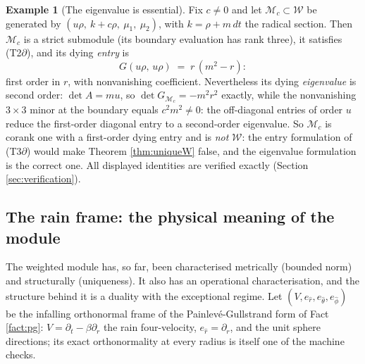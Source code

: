\documentclass[11pt]{article}
\theoremstyle{definition}
\newtheorem{example}[theorem]{Example}
\newcommand{\shW}{\mathcal{W}}
\newcommand{\dtPG}{dt}
\begin{document}
\begin{example}[The eigenvalue is essential]\label{ex:eigenentry}
Fix $c \neq 0$ and let $\mathcal{M}_c \subset \shW$ be generated by $(u\rho,\ k + c\rho,\ \mu_1,\ \mu_2)$, with $k = \rho + m\,\dtPG$ the radical section. Then $\mathcal{M}_c$ is a strict submodule (its boundary evaluation has rank three), it satisfies (T2$\partial$), and its dying \emph{entry} is
\[
G(u\rho,\,u\rho) \;=\; r\,(m^2 - r) :
\]
first order in $r$, with nonvanishing coefficient. Nevertheless its dying \emph{eigenvalue} is second order: $\det A = mu$, so $\det G_{\mathcal{M}_c} = -m^2 r^2$ exactly, while the nonvanishing $3\times 3$ minor at the boundary equals $c^2 m^2 \neq 0$: the off-diagonal entries of order $u$ reduce the first-order diagonal entry to a second-order eigenvalue. So $\mathcal{M}_c$ is corank one with a first-order dying entry and is \emph{not} $\shW$: the entry formulation of (T3$\partial$) would make Theorem \ref{thm:uniqueW} false, and the eigenvalue formulation is the correct one. All displayed identities are verified exactly (Section \ref{sec:verification}).
\end{example}

\subsection{The rain frame: the physical meaning of the module}\label{subsec:rainframe}

The weighted module has, so far, been characterised metrically (bounded norm) and structurally (uniqueness). It also has an operational characterisation, and the structure behind it is a duality with the exceptional regime. Let $(V, e_{\hat r}, e_{\hat\theta}, e_{\hat\phi})$ be the infalling orthonormal frame of the Painlev\'e-Gullstrand form of Fact \ref{fact:pg}: $V = \partial_t - \beta\partial_r$ the rain four-velocity, $e_{\hat r} = \partial_r$, and the unit sphere directions; its exact orthonormality at every radius is itself one of the machine checks.
\end{document}
